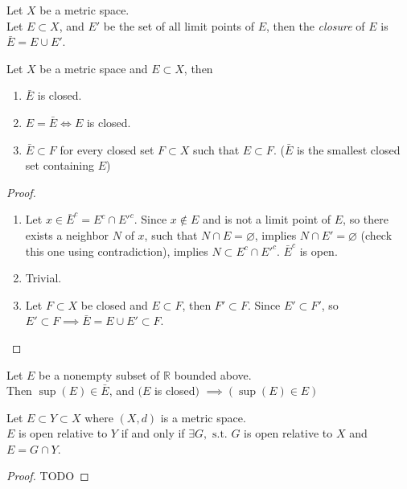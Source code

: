 \begin{definition}[Closure] Let $X$ be a metric space.
    \\ Let $E \subset X$, and $E'$ be the set of all limit points of $E$, then the \textit{closure} of $E$ is $\bar{E} = E \cup E'$.
\end{definition}

\begin{prop} Let $X$ be a metric space and $E \subset X$, then
\begin{enumerate}
    \item $\bar{E}$ is closed.
    \item $E = \bar{E} \iff E$ is closed.
    \item $\bar{E} \subset F$ for every closed set $F \subset X$ such that $E \subset F$. ($\bar{E}$ is the smallest closed set containing $E$)
\end{enumerate}
\end{prop}
\begin{proof} ~
\begin{enumerate}
    \item Let $x \in \bar{E}^{c}=E^{c}\cap E'^{c}$. Since $x \notin E$ and is not a limit point of $E$, so there exists a neighbor $N$ of $x$, such that $N \cap E = \varnothing$, implies $N \cap E' = \varnothing$ (check this one using contradiction), implies $N \subset E^{c}\cap E'^{c}$. $\bar{E}^{c}$ is open.
    \item Trivial.
    \item Let $F \subset X$ be closed and $E \subset F$, then $F' \subset F$. Since $E' \subset F'$, so $E' \subset F \implies \bar{E}=E \cup E' \subset F$.
\end{enumerate}
\end{proof}

\begin{prop} Let $E$ be a nonempty subset of $\mathbb{R}$ bounded above.
\\ Then $\sup(E)\in \bar{E}$, and $(E$ is closed$)$ $\implies (\sup(E)\in E)$
\end{prop}

\begin{prop} Let $E \subset Y \subset X$ where $(X,d)$ is a metric space.
\\$E$ is open relative to $Y$ if and only if $\exists G, \text{ s.t.}$ $G$ is open relative to $X$ and $E = G \cap  Y$.
\end{prop}
\begin{proof}
TODO
\end{proof}

